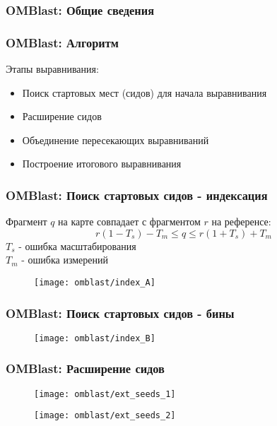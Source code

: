 \begin{frame}
\frametitle{OMBlast: Общие сведения}

\end{frame}

\begin{frame}
\frametitle{OMBlast: Алгоритм}

Этапы выравнивания:
\begin{itemize}
  \item Поиск стартовых мест (сидов) для начала выравнивания
  \item Расширение сидов
  \item Объединение пересекающих выравниваний
  \item Построение итогового выравнивания
\end{itemize}

\end{frame}

\begin{frame}
\frametitle{OMBlast: Поиск стартовых сидов - индексация}
  Фрагмент $q$ на карте совпадает с фрагментом $r$ на референсе:
  \begin{equation*}
    r(1 - T_s) - T_m \le q \le r(1 + T_s) + T_m
  \end{equation*}
  $T_s$ - ошибка масштабирования \\
  $T_m$ - ошибка измерений \\
  \begin{figure}
    \centering
    \texttt{[image: omblast/index\_A]}
  \end{figure}
\end{frame}

\begin{frame}
\frametitle{OMBlast: Поиск стартовых сидов - бины}
  \begin{figure}
    \centering
    \texttt{[image: omblast/index\_B]}
  \end{figure}
\end{frame}

\begin{frame}
\frametitle{OMBlast: Расширение сидов}
  \begin{figure}
    \centering
    \texttt{[image: omblast/ext\_seeds\_1]}
  \end{figure}
  \begin{figure}
    \centering
    \texttt{[image: omblast/ext\_seeds\_2]}
  \end{figure}
\end{frame}


